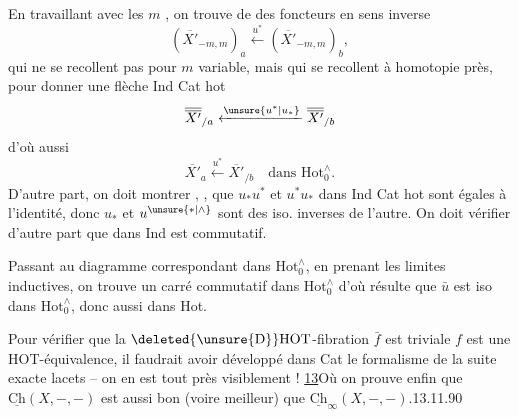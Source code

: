 En travaillant avec les $m$ , on trouve de  des foncteurs en sens inverse
\[
(\overline{X'}_{-m,m})_a\xleftarrow{u^*}(\overline{X'}_{-m,m})_b,
\]
qui ne se recollent pas pour $m$ variable, mais qui se recollent à homotopie près, pour donner une flèche  Ind Cat hot
\[
\overline{\overline{X'}}_{/a}\xleftarrow{\unsure{u^*|u_*}}\overline{\overline{X'}}_{/b}
\]
d'où aussi
\[
\overline{X'}_{a}\xleftarrow{u^*}\overline{X'}_{/b}\quad\text{dans }\mathrm{Hot}_0^{\wedge}.
\]
D'autre part, on doit  montrer ,
, que $u_*u^*$ et $u^*u_*$ dans Ind Cat hot sont égales à l'identité, donc $u_*$ et $u^{\unsure{*|\wedge}}$ sont des iso. inverses  de l'autre. On doit vérifier d'autre part  que
dans Ind   est commutatif.

Passant au  diagramme correspondant dans $\mathrm{Hot}_0^{\wedge}$, en prenant les limites inductives, on trouve un carré commutatif dans $\mathrm{Hot}_0^{\wedge}$
d'où résulte que $\bar u$ est iso dans $\mathrm{Hot}_0^{\wedge}$, donc aussi dans Hot.

Pour vérifier que la $\deleted{\unsure{\mathrm D}}\mathrm{HOT}$-fibration $\bar f$ est triviale  $f$ est une  HOT-équivalence, il faudrait avoir développé dans Cat le formalisme de la suite exacte  lacets -- on en est tout près\unsure{,} visiblement !
\uline{13}\quad Où on prouve enfin que $\underline{\mathrm{Ch}}(X,-,-)$ est aussi bon (voire meilleur) que $\underline{\mathrm{Ch}}_{\infty}(X,-,-)$.\hfill 13.11.90

